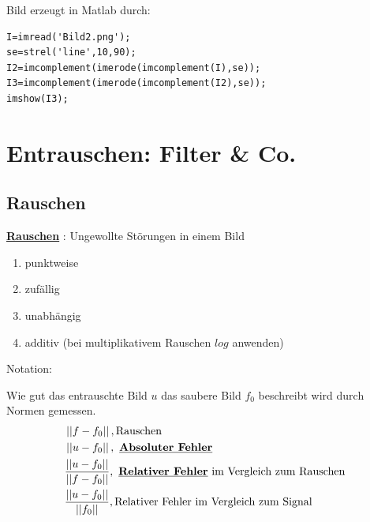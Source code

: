 \documentclass{article}
\theoremstyle{plain}
\theoremstyle{definition}
\numberwithin{equation}{section}
\newcommand{\norm}[1] {
\left|\left| #1 \right|\right|
}
\newcommand{\mim}[1] {
\underline{\textbf{#1\index{#1}}}
}
\begin{document}
        Bild erzeugt in Matlab durch:\\
        \begin{lstlisting}
I=imread('Bild2.png');
se=strel('line',10,90);
I2=imcomplement(imerode(imcomplement(I),se));
I3=imcomplement(imerode(imcomplement(I2),se));
imshow(I3);
        \end{lstlisting}

\section{Entrauschen: Filter \& Co.}
    \subsection{Rauschen}
        \mim{Rauschen}: Ungewollte Störungen in einem Bild
        \begin{enumerate}[label = \textbullet]
            \item punktweise
            \item zufällig
            \item unabhängig
            \item additiv (bei multiplikativem Rauschen $log$ anwenden)
        \end{enumerate}

        Notation:
        \begin{center}
        \end{center}

        Wie gut das entrauschte Bild $u$ das saubere Bild $f_0$ beschreibt wird durch Normen gemessen.
	    \begin{align*}
        &\norm{f-f_0}, \text{Rauschen}\\
        &\norm{u-f_0}, \text{\mim{Absoluter Fehler}}\\
        &\frac{\norm{u-f_0}}{\norm{f-f_0}}, \text{\mim{Relativer Fehler} im Vergleich zum Rauschen}\\
        &\frac{\norm{u-f_0}}{\norm{f_0}}, \text{Relativer Fehler im Vergleich zum Signal}
        \end{align*}
\end{document}
